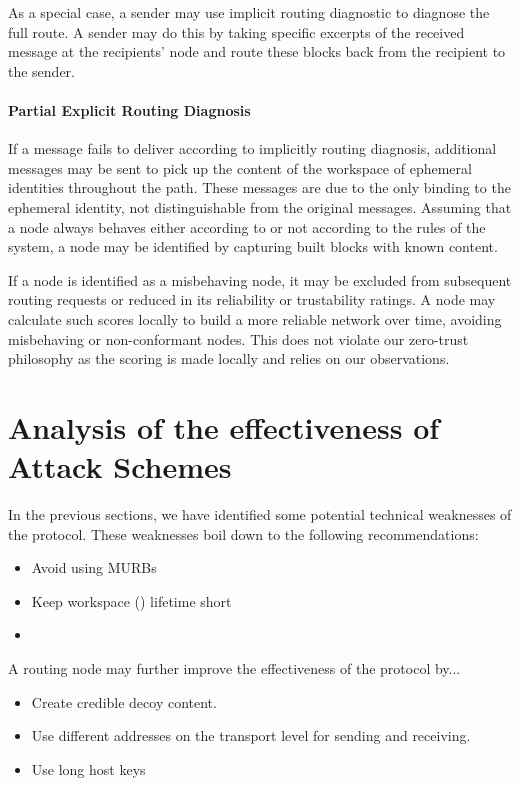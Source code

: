 As a special case, a sender may use implicit routing diagnostic to diagnose the full route. A sender may do this by taking specific excerpts of the received message at the recipients' node and route these blocks back from the recipient to the sender. 

\subsubsection{Partial Explicit Routing Diagnosis}
If a message fails to deliver according to implicitly routing diagnosis, additional messages may be sent to pick up the content of the workspace of ephemeral identities throughout the path. These messages are due to the only binding to the ephemeral identity, not distinguishable from the original messages. Assuming that a node always behaves either according to or not according to the rules of the system, a node may be identified by capturing built blocks with known content.

If a node is identified as a misbehaving node, it may be excluded from subsequent routing requests or reduced in its reliability or trustability ratings. A node may calculate such scores locally to build a more reliable network over time, avoiding misbehaving or non-conformant nodes. This does not violate our zero-trust philosophy as the scoring is made locally and relies on our observations.


\chapter{Analysis of the effectiveness of Attack Schemes}
In the previous sections, we have identified some potential technical weaknesses of the protocol. These weaknesses boil down to the following recommendations:
\begin{itemize}
	\item Avoid using MURBs
	\item Keep workspace () lifetime short
	\item 
\end{itemize}

A routing node may further improve the effectiveness of the protocol by...

\begin{itemize}
	\item Create credible decoy content.
	\item Use different addresses on the transport level for sending and receiving.
	\item Use long host keys
\end{itemize}

